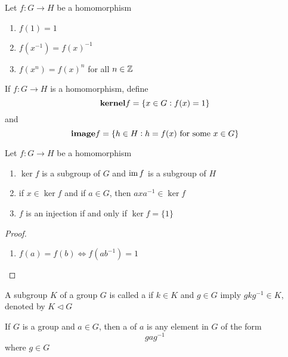\documentclass[11pt]{article}
\begin{document}
\begin{lemma}[]
Let \(f:G\to H\) be a homomorphism
\begin{enumerate}
\item \(f(1)=1\)
\item \(f(x^{-1})=f(x)^{-1}\)
\item \(f(x^n)=f(x)^n\) for all \(n\in\mathbb{Z}\)
\end{enumerate}
\end{lemma}

\begin{definition}[]
If \(f:G\to H\) is a homomorphism, define
\begin{equation*}
\textbf{kernel}f=\{x\in G:f(x)=1\}
\end{equation*}
and
\begin{equation*}
\textbf{image}f=\{h\in H:h=f(x)\text{ for some } x\in G\}
\end{equation*}
\end{definition}

\begin{proposition}[]
Let \(f:G\to H\) be a homomorphism
\begin{enumerate}
\item \(\ker f\) is a subgroup of \(G\) and \(\operatorname{im} f\) is a subgroup of \(H\)
\item if \(x\in\ker f\) and if \(a\in G\), then \(axa^{-1}\in\ker f\)
\item \(f\) is an injection if and only if \(\ker f=\{1\}\)
\end{enumerate}
\end{proposition}

\begin{proof}
\begin{enumerate}
\item \(f(a)=f(b)\Leftrightarrow f(ab^{-1})=1\)
\end{enumerate}
\end{proof}

\begin{definition}[]
A subgroup \(K\) of a group \(G\) is called a  if \(k\in K\)
and \(g\in G\) imply \(gkg^{-1}\in K\), denoted by \(K\triangleleft G\)
\end{definition}

\begin{definition}[]
If \(G\) is a group and \(a\in G\), then a  of \(a\) is any element
in \(G\) of the form
\begin{equation*}
gag^{-1}
\end{equation*}
where \(g\in G\)
\end{definition}
\end{document}
